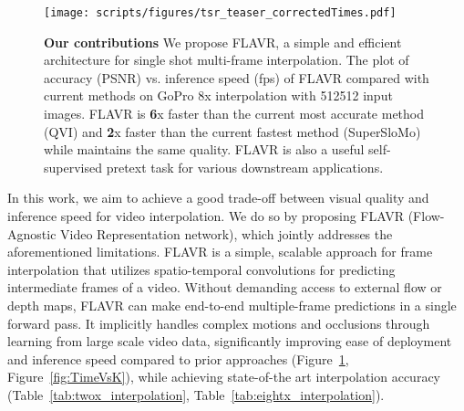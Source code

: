 \documentclass[10pt,twocolumn,letterpaper]{article}
\newcommand{\figref}[1]{Figure~\ref{#1}}
\newcommand{\tabref}[1]{Table~\ref{#1}}
\newcommand{\Ours}{FLAVR}
\begin{document}
\begin{figure}
    \begin{center}
    \texttt{[image: scripts/figures/tsr\_teaser\_correctedTimes.pdf]}
    \end{center}
    \vspace{-16pt}
    \caption{{\bf Our contributions} We propose FLAVR, a simple and efficient architecture for single shot multi-frame interpolation. The plot of accuracy (PSNR) vs. inference speed (fps) of FLAVR compared with current methods on GoPro 8x interpolation with 512512 input images. FLAVR is {\bf 6}x faster than the current most accurate method (QVI) and {\bf 2}x faster than the current fastest method (SuperSloMo) while maintains the same quality. FLAVR is also a useful self-supervised pretext task for various downstream applications.
    }
    \vspace{-12pt}
    \label{fig:intro_pic}
\end{figure}


In this work, we aim to achieve a good trade-off between visual quality and inference speed for video interpolation. We do so by proposing \Ours{} (Flow-Agnostic Video Representation network), which jointly addresses the aforementioned limitations. \Ours{} is a simple, scalable approach for frame interpolation that utilizes spatio-temporal convolutions for predicting intermediate frames of a video. Without demanding access to external flow or depth maps, \Ours{} can make end-to-end multiple-frame predictions in a single forward pass. It implicitly handles complex motions and occlusions through learning from large scale video data, significantly improving ease of deployment and inference speed compared to prior approaches (\figref{fig:intro_pic}, \figref{fig:TimeVsK}), while achieving state-of-the art interpolation accuracy (\tabref{tab:twox_interpolation}, \tabref{tab:eightx_interpolation}).  
\end{document}
